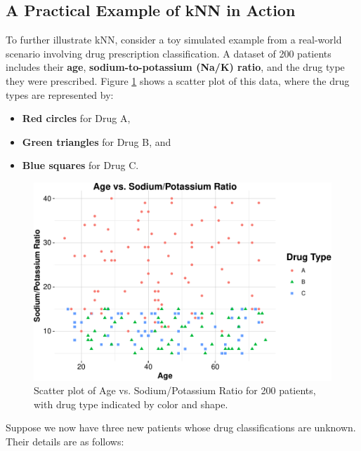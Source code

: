 \documentclass[
]{book}
\providecommand{\tightlist}{%
  \setlength{\itemsep}{0pt}\setlength{\parskip}{0pt}}
\theoremstyle{definition}
\theoremstyle{definition}
\theoremstyle{definition}
\theoremstyle{definition}
\theoremstyle{remark}
\begin{document}
\subsection*{A Practical Example of kNN in Action}\label{a-practical-example-of-knn-in-action}

To further illustrate kNN, consider a toy simulated example from a real-world scenario involving drug prescription classification. A dataset of 200 patients includes their \textbf{age}, \textbf{sodium-to-potassium (Na/K) ratio}, and the drug type they were prescribed. Figure \ref{fig:scatter-plot-ex-drug} shows a scatter plot of this data, where the drug types are represented by:

\begin{itemize}
\tightlist
\item
  \textbf{Red circles} for Drug A,\\
\item
  \textbf{Green triangles} for Drug B, and\\
\item
  \textbf{Blue squares} for Drug C.
\end{itemize}

\begin{figure}

{\centering \includegraphics[width=0.85\linewidth]{knn_files/figure-latex/scatter-plot-ex-drug-1} 

}

\caption{Scatter plot of Age vs. Sodium/Potassium Ratio for 200 patients, with drug type indicated by color and shape.}\label{fig:scatter-plot-ex-drug}
\end{figure}

Suppose we now have three new patients whose drug classifications are unknown. Their details are as follows:
\end{document}
